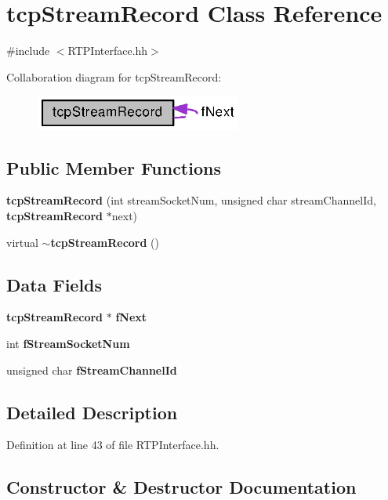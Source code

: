 \section{tcp\+Stream\+Record Class Reference}
\label{classtcpStreamRecord}


{\ttfamily \#include $<$R\+T\+P\+Interface.\+hh$>$}



Collaboration diagram for tcp\+Stream\+Record\+:
\nopagebreak
\begin{figure}[H]
\begin{center}
\leavevmode
\includegraphics[width=191pt]{classtcpStreamRecord__coll__graph}
\end{center}
\end{figure}
\subsection*{Public Member Functions}
\begin{DoxyCompactItemize}
\item 
{\bf tcp\+Stream\+Record} (int stream\+Socket\+Num, unsigned char stream\+Channel\+Id, {\bf tcp\+Stream\+Record} $\ast$next)
\item 
virtual {\bf $\sim$tcp\+Stream\+Record} ()
\end{DoxyCompactItemize}
\subsection*{Data Fields}
\begin{DoxyCompactItemize}
\item 
{\bf tcp\+Stream\+Record} $\ast$ {\bf f\+Next}
\item 
int {\bf f\+Stream\+Socket\+Num}
\item 
unsigned char {\bf f\+Stream\+Channel\+Id}
\end{DoxyCompactItemize}


\subsection{Detailed Description}


Definition at line 43 of file R\+T\+P\+Interface.\+hh.



\subsection{Constructor \& Destructor Documentation}
